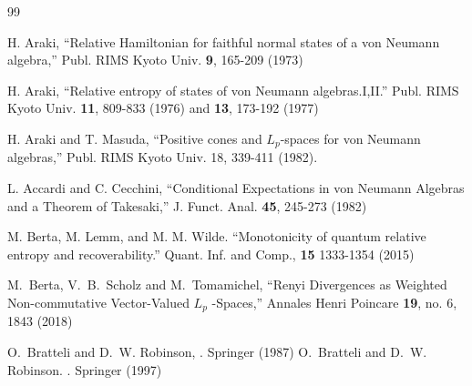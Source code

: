 \documentclass[english,a4paper,12pt]{article}
\begin{document}
\begin{thebibliography}{99}






H. Araki,
``Relative Hamiltonian for faithful normal states of a von Neumann algebra,''
 Publ. RIMS Kyoto Univ. {\bf 9}, 165-209 (1973)

 H. Araki,
``Relative entropy of states of von Neumann algebras.I,II.''
Publ. RIMS Kyoto Univ. {\bf 11}, 809-833 (1976) and {\bf 13}, 173-192 (1977)

H. Araki and T. Masuda, ``Positive cones and $L_p$-spaces for von Neumann algebras,'' Publ. RIMS Kyoto Univ. 18, 339-411 (1982). 



L. Accardi and C. Cecchini, ``Conditional Expectations in von Neumann Algebras and a Theorem of Takesaki,''
J. Funct. Anal. {\bf 45}, 245-273 (1982)


M. Berta, M. Lemm, and M. M. Wilde. ``Monotonicity of quantum relative entropy and recoverability.'' Quant. Inf. and Comp., {\bf 15} 1333-1354 (2015) 

M.~Berta, V.~B.~Scholz and M.~Tomamichel,
  ``Renyi Divergences as Weighted Non-commutative Vector-Valued $L_p$ -Spaces,''
  Annales Henri Poincare {\bf 19}, no. 6, 1843 (2018)


 O.~Bratteli and D.~W. Robinson,
.
\newblock Springer (1987)
O.~Bratteli and D.~W. Robinson.
.
\newblock Springer (1997)


\end{thebibliography}
\end{document}
